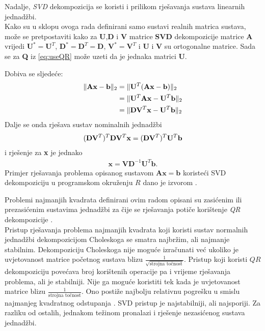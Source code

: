 \documentclass[a4paper,twoside,12pt]{memoir} %
\begin{document}
Nadalje, \textit{SVD} dekompozicija se koristi i prilikom rješavanja sustava linearnih jednadžbi.\\
Kako su u sklopu ovoga rada definirani samo sustavi realnih matrica sustava, može se pretpostaviti kako
za \textbf{U},\textbf{D} i \textbf{V} matrice \textbf{SVD} dekompozicije matrice \textbf{A}
vrijedi $\mathbf{U}^* = \mathbf{U}^T$, $\mathbf{D}^* = \mathbf{D}^T = \mathbf{D}$, $\mathbf{V}^* = \mathbf{V}^T$ i \textbf{U} i \textbf{V} su ortogonalne matrice.
Sada se za \textbf{Q} iz \eqref{eq:useQR} može uzeti da je jednaka matrici \textbf{U}. 

Dobiva se sljedeće:
\begin{align}\label{eq:useSVD}
\| \mathbf{A}\mathbf{x} - \mathbf{b} \|_2	
& = \| \mathbf{U}^T(\mathbf{A}\mathbf{x} - \mathbf{b}) \|_2 \\
& = \| \mathbf{U}^T \mathbf{A}\mathbf{x} - \mathbf{U}^T \mathbf{b} \|_2	\notag \\
& = \| \mathbf{D} \mathbf{V}^T\mathbf{x} - \mathbf{U}^T \mathbf{b} \|_2 \notag
\end{align}
Dalje se onda rješava sustav nominalnih jednadžbi
\begin{align}
(\mathbf{D} \mathbf{V}^T)^T\mathbf{D} \mathbf{V}^T\mathbf{x} 
& = (\mathbf{D} \mathbf{V}^T)^T\mathbf{U}^T \mathbf{b} \notag \\
\end{align} i rješenje za \textbf{x} je jednako
\begin{align}
\mathbf{x} = \mathbf{V}\mathbf{D}^{-1}\mathbf{U}^T \mathbf{b}.
\end{align}
Primjer rješavanja problema opisanog sustavom $\mathbf{A}\mathbf{x} = \mathbf{b}$ koristeći SVD dekompoziciju u programskom okruženju $R$ dano je izvorom \cite{svd_Rexample}.
\label{page:boljaQRzaSustav}%


\newpage
Problemi najmanjih kvadrata definirani ovim radom opisani su zasićenim ili prezasićenim sustavima jednadžbi za čije se rješavanja potiče korištenje \textit{QR} dekompozicije \cite{svd_str15}.\\
Pristup rješavanja problema najmanjih kvadrata koji koristi sustav normalnih jednadžbi dekompozicijom Choleskoga se smatra najbržim, ali najmanje stabilnim. Dekompoziciju Choleskoga nije moguće izračunati već ukoliko je uvjetovanost matrice početnog sustava blizu $\frac{1}{\sqrt{\text{strojna točnost}}}$. Pristup koji koristi $QR$ dekompoziciju povećava broj korištenih operacije pa i vrijeme rješavanja problema, ali je stabilniji. Nije ga moguće koristiti tek kada je uvjetovanost matrice blizu  $\frac{1}{\text{strojna točnost}}$. Ono postiže najbolju relativnu pogrešku u smislu najmanjeg kvadratnog odstupanja \cite{svd_QR_normalEquations_comparison_str42}.
SVD pristup je najstabilniji, ali najsporiji. Za razliku od ostalih, jednakom težinom pronalazi i rješenje 
nezasićenog sustava jednadžbi.\\
\end{document}
